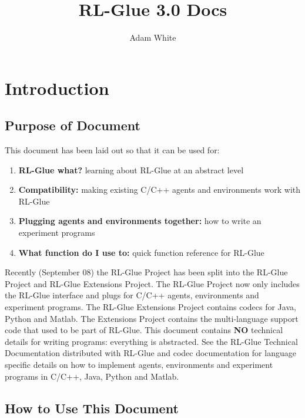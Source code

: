 \documentclass[11pt]{article}
\title{RL-Glue 3.0 Docs}
\author{Adam White}
\begin{document}
\maketitle
\tableofcontents


\section{Introduction}
\subsection{Purpose of Document}
This document has been laid out so that it can be used for: 
\begin{enumerate}
\item  {\bf RL-Glue what?} learning about RL-Glue at an abstract level
\item {\bf Compatibility:} making existing C/C++ agents and environments work with RL-Glue
\item {\bf Plugging agents and environments together:} how to write an experiment programs
\item{\bf What function do I use to:} quick function reference for RL-Glue
\end{enumerate}

Recently (September 08) the RL-Glue Project has been split into the RL-Glue Project and RL-Glue Extensions Project. The RL-Glue Project now only includes the RL-Glue interface and plugs for C/C++ agents, environments and experiment programs. The RL-Glue Extensions Project contains codecs for Java, Python and Matlab. The Extensions Project contains the multi-language support code that used to be part of RL-Glue. This document contains {\bf NO} technical details for writing programs: everything is abstracted. See the RL-Glue Technical Documentation distributed with RL-Glue and codec documentation for language specific details on how to implement agents, environments and experiment programs in C/C++, Java, Python and Matlab.
 
\subsection{How to Use This Document}
\end{document}
